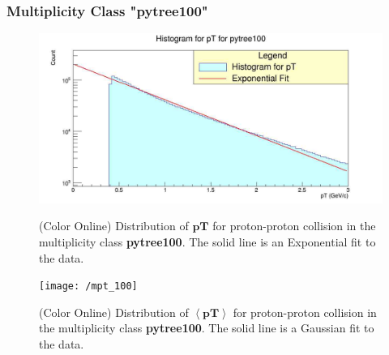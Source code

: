 \documentclass[letterpaper,aps,prc,superscriptaddress,nofootinbib,10pt,showpacs,floatfix]{revtex4-2}%
\begin{document}
\subsubsection{Multiplicity Class "pytree100"}
\label{subsubsec:100}
\vspace{-5mm}
\begin{figure}[!htb]
   \begin{minipage}{0.48\textwidth}
   \label{Fig:5a}
   \label{Fig:5b}
     \centering
     \renewcommand{\thefigure}{5a}
     \includegraphics[width=1.1\linewidth]{pt_100}
     \caption{(Color Online) Distribution of $\mathbf{pT}$ for proton-proton collision in the multiplicity class \textbf{pytree100}. The solid line is an Exponential fit to the data.}
   \end{minipage}\hfill
   \begin{minipage}{0.48\textwidth}
     \centering
     \renewcommand{\thefigure}{5b}
     \texttt{[image: /mpt\_100]}
     \caption{(Color Online) Distribution of $\mathbf{\left<pT\right>}$ for proton-proton collision in the multiplicity class \textbf{pytree100}. The solid line is a Gaussian fit to the data.}
   \end{minipage}
\end{figure}

\FloatBarrier
\end{document}

